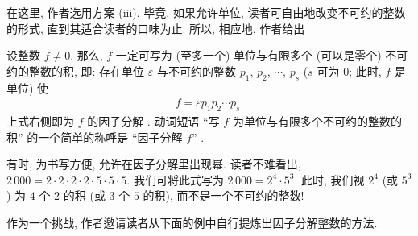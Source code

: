 在这里, 作者选用方案 (iii). 毕竟, 如果允许单位, 读者可自由地改变不可约的整数的形式, 直到其适合读者的口味为止. 所以, 相应地, 作者给出
\begin{definition}
    设整数 $f \neq 0$. 那么, $f$ 一定可写为 (至多一个) 单位与有限多个 (可以是零个) 不可约的整数的积, 即: 存在单位 $\varepsilon$ 与不可约的整数 $p_1$, $p_2$, $\cdots$, $p_s$ ($s$ 可为 $0$; 此时, $f$ 是单位) 使
    \begin{align*}
        f = \varepsilon p_1 p_2 \cdots p_s.
    \end{align*}
    上式右侧即为 $f$ 的因子分解 . 动词短语 ``写 $f$ 为单位与有限多个不可约的整数的积'' 的一个简单的称呼是 ``因子分解 $f$'' .
\end{definition}

\begin{remark}
    有时, 为书写方便, 允许在因子分解里出现幂. 读者不难看出, $2\,000 = 2 \cdot 2 \cdot 2 \cdot 2 \cdot 5 \cdot 5 \cdot 5$. 我们可将此式写为 $2\,000 = 2^4 \cdot 5^3$. 此时, 我们视 $2^4$ (或 $5^3$) 为 $4$ 个 $2$ 的积 (或 $3$ 个 $5$ 的积), 而不是一个不可约的整数!
\end{remark}

作为一个挑战, 作者邀请读者从下面的例中自行提炼出因子分解整数的方法.

